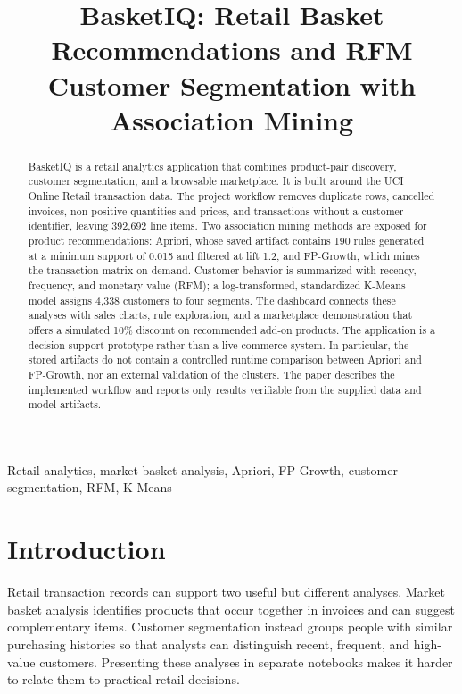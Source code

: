 \documentclass[10pt,conference]{IEEEtran}
\title{BasketIQ: Retail Basket Recommendations and RFM Customer Segmentation with Association Mining}
\author{\IEEEauthorblockN{Sukumar Sawant, Rohit Soneji, Piyush Gupta}
\IEEEauthorblockA{Department of Computer Engineering\\
Vidyalankar Institute of Technology, Mumbai, India\\
Student IDs: 24102B0049, 24102B0059, 24102B0054}}
\begin{document}
\maketitle

\begin{abstract}
BasketIQ is a retail analytics application that combines product-pair discovery, customer segmentation, and a browsable marketplace. It is built around the UCI Online Retail transaction data. The project workflow removes duplicate rows, cancelled invoices, non-positive quantities and prices, and transactions without a customer identifier, leaving 392,692 line items. Two association mining methods are exposed for product recommendations: Apriori, whose saved artifact contains 190 rules generated at a minimum support of 0.015 and filtered at lift 1.2, and FP-Growth, which mines the transaction matrix on demand. Customer behavior is summarized with recency, frequency, and monetary value (RFM); a log-transformed, standardized K-Means model assigns 4,338 customers to four segments. The dashboard connects these analyses with sales charts, rule exploration, and a marketplace demonstration that offers a simulated 10\% discount on recommended add-on products. The application is a decision-support prototype rather than a live commerce system. In particular, the stored artifacts do not contain a controlled runtime comparison between Apriori and FP-Growth, nor an external validation of the clusters. The paper describes the implemented workflow and reports only results verifiable from the supplied data and model artifacts.
\end{abstract}

\begin{IEEEkeywords}
Retail analytics, market basket analysis, Apriori, FP-Growth, customer segmentation, RFM, K-Means
\end{IEEEkeywords}

\section{Introduction}
Retail transaction records can support two useful but different analyses. Market basket analysis identifies products that occur together in invoices and can suggest complementary items. Customer segmentation instead groups people with similar purchasing histories so that analysts can distinguish recent, frequent, and high-value customers. Presenting these analyses in separate notebooks makes it harder to relate them to practical retail decisions.
\end{document}
